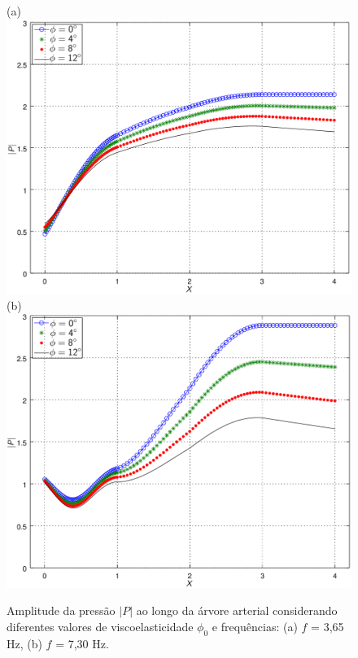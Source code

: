 \documentclass[a4paper,12pt]{monografia}
\theoremstyle{plain}
\theoremstyle{definition}
\theoremstyle{remark}
\begin{document}
\begin{figure}[!htbp]
	\centering
	(a) \\
	\includegraphics[scale=0.7]{figure4-result-new/Fig4_P_f3_65_visco_new2.png}\\
	(b)\\
	\includegraphics[scale=0.7]{figure4-result-new/Fig4_P_f7_30_visco_new2.png}\\
	\caption{Amplitude da pressão $|P|$ ao longo da árvore arterial considerando diferentes valores de viscoelasticidade $\phi_0$ e frequências: (a) $f$ = 3,65 Hz, (b)  $f$ = 7,30 Hz. }
	\label{fig4a:arterial-tree}%
\end{figure}
\end{document}
